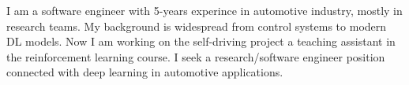 I am a software engineer with 5-years experince in automotive industry, mostly
in research teams. My background is widespread from control systems to modern DL
models. Now I am working on the self-driving project a teaching assistant in the
reinforcement learning course. I seek a research/software engineer position
connected with deep learning in automotive applications.
